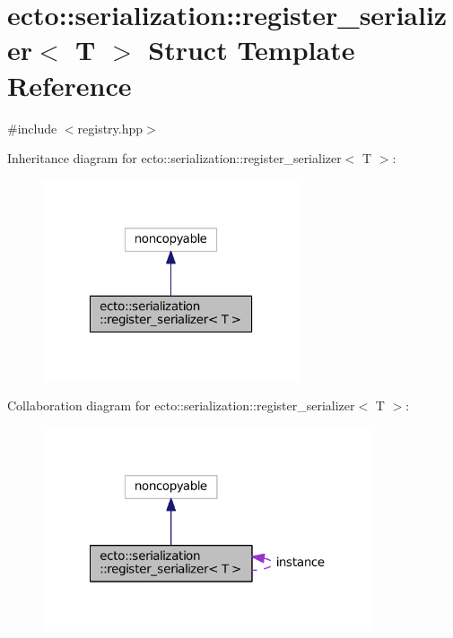 \hypertarget{structecto_1_1serialization_1_1register__serializer}{\section{ecto\-:\-:serialization\-:\-:register\-\_\-serializer$<$ T $>$ Struct Template Reference}
\label{structecto_1_1serialization_1_1register__serializer}
}


{\ttfamily \#include $<$registry.\-hpp$>$}



Inheritance diagram for ecto\-:\-:serialization\-:\-:register\-\_\-serializer$<$ T $>$\-:\nopagebreak
\begin{figure}[H]
\begin{center}
\leavevmode
\includegraphics[width=214pt]{structecto_1_1serialization_1_1register__serializer__inherit__graph}
\end{center}
\end{figure}


Collaboration diagram for ecto\-:\-:serialization\-:\-:register\-\_\-serializer$<$ T $>$\-:\nopagebreak
\begin{figure}[H]
\begin{center}
\leavevmode
\includegraphics[width=276pt]{structecto_1_1serialization_1_1register__serializer__coll__graph}
\end{center}
\end{figure}

